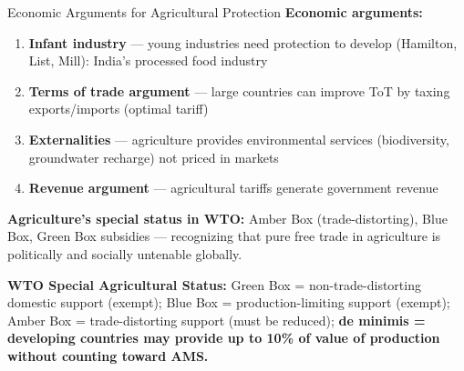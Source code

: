 \documentclass[
  ignorenonframetext,
  aspectratio=169,
]{beamer}
\makeatletter
\providecommand{\tightlist}{%
  \setlength{\itemsep}{0pt}\setlength{\parskip}{0pt}}
\let\quarto@originallabel\label
\DeclareRobustCommand*{\label}[1]{\quarto@originallabel{#1}}
\makeatother
\begin{document}
\begin{frame}{Economic Arguments for Agricultural Protection}
\label{economic-arguments-for-agricultural-protection}
\textbf{Economic arguments:}

\begin{enumerate}
\tightlist
\item
  \textbf{Infant industry} --- young industries need protection to
  develop (Hamilton, List, Mill): India's processed food industry
\item
  \textbf{Terms of trade argument} --- large countries can improve ToT
  by taxing exports/imports (optimal tariff)
\item
  \textbf{Externalities} --- agriculture provides environmental services
  (biodiversity, groundwater recharge) not priced in markets
\item
  \textbf{Revenue argument} --- agricultural tariffs generate government
  revenue
\end{enumerate}

\textbf{Agriculture's special status in WTO:} Amber Box
(trade-distorting), Blue Box, Green Box subsidies --- recognizing that
pure free trade in agriculture is politically and socially untenable
globally.

\textbf{WTO Special Agricultural Status:} Green Box =
non-trade-distorting domestic support (exempt); Blue Box =
production-limiting support (exempt); Amber Box = trade-distorting
support (must be reduced); \textbf{de minimis = developing countries may
provide up to 10\% of value of production without counting toward AMS.}
\end{frame}
\end{document}
